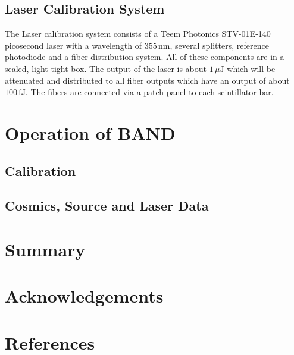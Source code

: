 \documentclass[review]{elsarticle}
\begin{document}
\subsection{Laser Calibration System}
The Laser calibration system consists of a Teem Photonics STV-01E-140 picosecond laser with a wavelength of $355\,\mathrm{nm}$, several splitters, reference photodiode and a fiber distribution system. All of these components are in a sealed, light-tight box. The output of the laser is about $1\,\mu\mathrm{J}$ which will be attenuated and distributed to all fiber outputs which have an output of about $100\,\mathrm{fJ}$. The fibers are connected via a patch panel to each scintillator bar. 


\section{Operation of BAND}

\subsection{Calibration}

\subsection{Cosmics, Source and Laser Data}

\section{Summary}


\section{Acknowledgements}


\section*{References}

\end{document}
